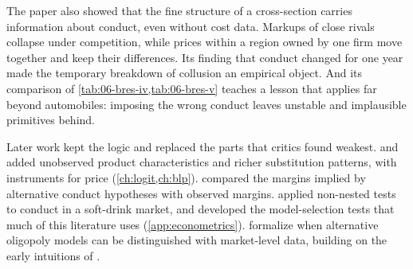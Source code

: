 The paper also showed that the fine structure of a cross-section carries information about conduct, even without
cost data. Markups of close rivals collapse under competition, while prices within a region owned by one firm move
together and keep their differences. Its finding that conduct changed for one year made the temporary breakdown of collusion an empirical
object. And its comparison of \cref{tab:06-bres-iv,tab:06-bres-v} teaches a lesson that applies far beyond
automobiles: imposing the wrong conduct leaves unstable and implausible primitives behind.

Later work kept the logic and replaced the parts that critics found weakest. \citet{Berry1994} and
\citet{BerryLevinsohnPakes1995} added unobserved product characteristics and richer substitution patterns, with
instruments for price (\cref{ch:logit,ch:blp}). \citet{Nevo2001} compared the margins implied by alternative conduct
hypotheses with observed margins. \citet{GasmiLaffontVuong1992} applied non-nested tests to conduct in a soft-drink
market, and \citet{Vuong1989} developed the model-selection tests that much of this literature uses
(\cref{app:econometrics}). \citet{BerryHaile2014} formalize when alternative oligopoly models can be distinguished
with market-level data, building on the early intuitions of \citet{Bresnahan1981,Bresnahan1982}.
